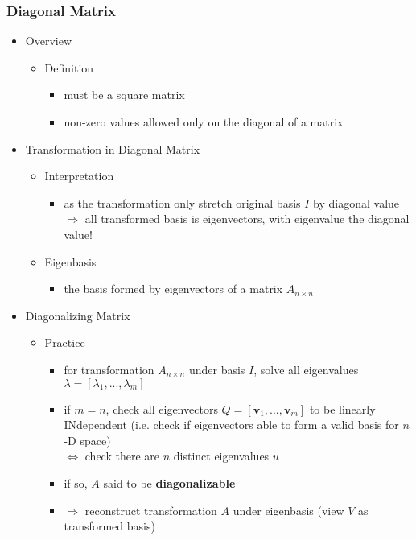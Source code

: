 \subsubsection{Diagonal Matrix}
\begin{itemize}
\item Overview
	\begin{itemize}
	\item Definition
		\begin{itemize}
		\item must be a square matrix
		\item non-zero values allowed only on the diagonal of a matrix
		\end{itemize}
	\end{itemize}
\item Transformation in Diagonal Matrix
	\begin{itemize}
	\item Interpretation
		\begin{itemize}
		\item as the transformation only stretch original basis $I$ by diagonal value \\
		$\Rightarrow$ all transformed basis is eigenvectors, with eigenvalue the diagonal value!
		\end{itemize}
	\item Eigenbasis
		\begin{itemize}
		\item the basis formed by eigenvectors of a matrix $A_{n\times n}$ \\
		\end{itemize}
	\end{itemize}
\item Diagonalizing Matrix
	\begin{itemize}
	\item Practice
		\begin{itemize}
		\item for transformation $A_{n\times n}$ under basis $I$, solve all eigenvalues $\lambda = [\lambda_1,...,\lambda_m]$
		\item if $m=n$, check all eigenvectors $Q = [\mathbf v_1,...,\mathbf v_m]$ to be linearly INdependent
		(i.e. check if eigenvectors able to form a valid basis for $n$-D space) \\
		$\Leftrightarrow$ check there are $n$ distinct eigenvalues $u$
		\item if so, $A$ said to be \textbf{diagonalizable}
		\item $\Rightarrow$ reconstruct transformation $A$ under eigenbasis (view $V$ as transformed basis) \\

\end{itemize}
\end{itemize}
\end{itemize}
